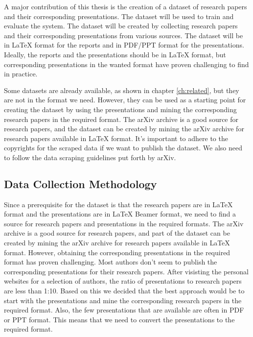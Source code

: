 A major contribution of this thesis is the creation of a dataset of research papers and their corresponding presentations. The dataset will be used to train and evaluate the system. The dataset will be created by collecting research papers and their corresponding presentations from various sources. The dataset will be in \LaTeX{} format for the reports and in PDF/PPT format for the presentations. Ideally, the reports and the presentations should be in LaTeX format, but corresponding presentations in the wanted format have proven challenging to find in practice. 

Some datasets are already available, as shown in chapter \ref{ch:related}, but they are not in the format we need. However, they can be used as a starting point for creating the dataset by using the presentations and mining the corresponding research papers in the required format. The arXiv archive is a good source for research papers, and the dataset can be created by mining the arXiv archive for research papers available in \LaTeX{} format. It's important to adhere to the copyrights for the scraped data if we want to publish the dataset. We also need to follow the data scraping guidelines put forth by arXiv.

\subsection{Data Collection Methodology}

Since a prerequisite for the dataset is that the research papers are in \LaTeX{} format and the presentations are in \LaTeX{} Beamer format, we need to find a source for research papers and presentations in the required formats. The arXiv archive is a good source for research papers, and part of the dataset can be created by mining the arXiv archive for research papers available in \LaTeX{} format. However, obtaining the corresponding presentations in the required format has proven challenging. Most authors don't seem to publish the corresponding presentations for their research papers. After visisting the personal websites for a selection of authors, the ratio of presentations to research papers are less than 1:10. Based on this we decided that the best approach would be to start with the presentations and mine the corresponding research papers in the required format. Also, the few presentations that are available are often in PDF or PPT format. This means that we need to convert the presentations to the required format. 

